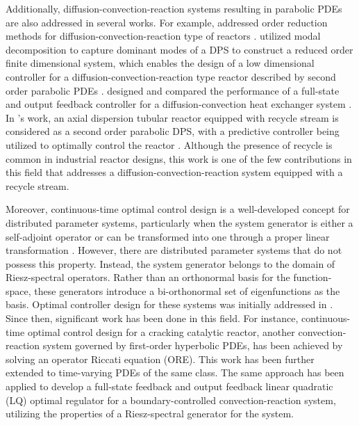 Additionally, diffusion-convection-reaction systems resulting in parabolic PDEs are also addressed in several works. For example,  addressed order reduction methods for diffusion-convection-reaction type of reactors \autocite{Christofides2012book}.  utilized modal decomposition to capture dominant modes of a DPS to construct a reduced order finite dimensional system, which enables the design of a low dimensional controller for a diffusion-convection-reaction type reactor described by second order parabolic PDEs \autocite{dubljevic2006predictive2}.  designed and compared the performance of a full-state and output feedback controller for a diffusion-convection heat exchanger system \autocite{ozorio2019heat}. In 's work, an axial dispersion tubular reactor equipped with recycle stream is considered as a second order parabolic DPS, with a predictive controller being utilized to optimally control the reactor \autocite{khatibi2021model}.  Although the presence of recycle is common in industrial reactor designs, this work is one of the few contributions in this field that addresses a diffusion-convection-reaction system equipped with a recycle stream.

Moreover, continuous-time optimal control design is a well-developed concept for distributed parameter systems, particularly when the system generator is either a self-adjoint operator or can be transformed into one through a proper linear transformation \autocite{morrisbook}. However, there are distributed parameter systems that do not possess this property. Instead, the system generator belongs to the domain of Riesz-spectral operators. Rather than an orthonormal basis for the function-space, these generators introduce a bi-orthonormal set of eigenfunctions as the basis. Optimal controller design for these systems was initially addressed in  \autocite{curtainbook}. Since then, significant work has been done in this field. For instance, continuous-time optimal control design for a cracking catalytic reactor, another convection-reaction system governed by first-order hyperbolic PDEs, has been achieved by solving an operator Riccati equation (ORE)\autocite{aksikas2009lq}. This work has been further extended to time-varying PDEs of the same class\autocite{aksikas2013optimal}. The same approach has been applied to develop a full-state feedback\autocite{mohammadi2012lq} and output feedback\autocite{aksikas2024spectral} linear quadratic (LQ) optimal regulator for a boundary-controlled convection-reaction system, utilizing the properties of a Riesz-spectral generator for the system.

